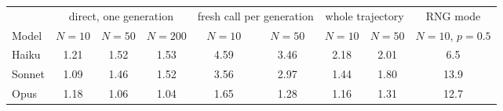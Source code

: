\begin{tabular}{lcccccccc}
\toprule
 & \multicolumn{3}{c}{direct, one generation} & \multicolumn{2}{c}{fresh call per generation} & \multicolumn{2}{c}{whole trajectory} & RNG mode \\
\cmidrule(lr){2-4}\cmidrule(lr){5-6}\cmidrule(lr){7-8}\cmidrule(lr){9-9}
Model & $N=10$ & $N=50$ & $N=200$ & $N=10$ & $N=50$ & $N=10$ & $N=50$ & $N=10$, $p=0.5$ \\
\midrule
Haiku & 1.21 & 1.52 & 1.53 & 4.59 & 3.46 & 2.18 & 2.01 & 6.5 \\
Sonnet & 1.09 & 1.46 & 1.52 & 3.56 & 2.97 & 1.44 & 1.80 & 13.9 \\
Opus & 1.18 & 1.06 & 1.04 & 1.65 & 1.28 & 1.16 & 1.31 & 12.7 \\
\bottomrule
\end{tabular}
